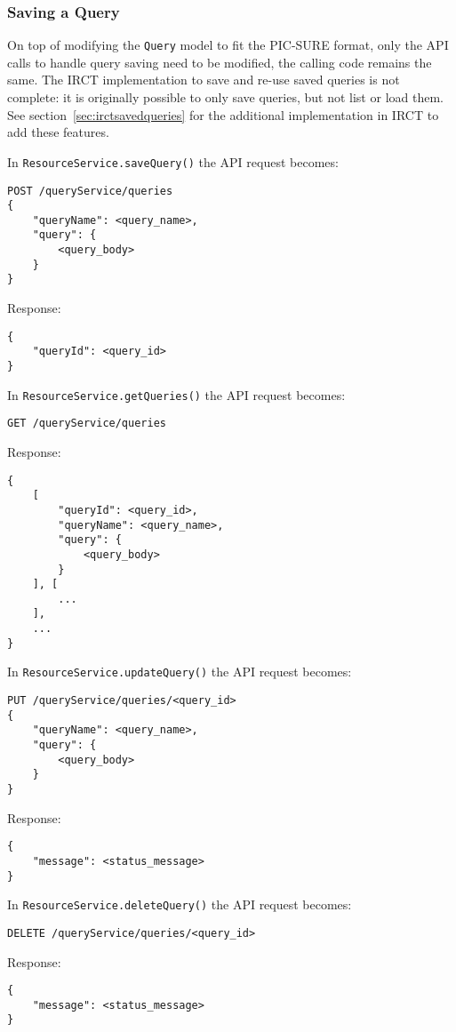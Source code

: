 \subsubsection{Saving a Query}
On top of modifying the \verb|Query| model to fit the PIC-SURE format, only the API calls to handle query saving need to be modified, the calling code remains the same.
The IRCT implementation to save and re-use saved queries is not complete: it is originally possible to only save queries, but not list or load them. 
See section~\ref{sec:irctsavedqueries} for the additional implementation in IRCT to add these features.

In \verb|ResourceService.saveQuery()| the API request becomes:
\begin{verbatim}
POST /queryService/queries
{
    "queryName": <query_name>,
    "query": {
        <query_body>
    }
}    
\end{verbatim}

Response:
\begin{verbatim}
{
    "queryId": <query_id>
}    
\end{verbatim}

In  \verb|ResourceService.getQueries()| the API request becomes:
\begin{verbatim}
GET /queryService/queries
\end{verbatim}

Response:
\begin{verbatim}
{
    [
        "queryId": <query_id>,
        "queryName": <query_name>,
        "query": {
            <query_body>
        }
    ], [
        ...
    ],
    ...
}    
\end{verbatim}

In  \verb|ResourceService.updateQuery()| the API request becomes:
\begin{verbatim}
PUT /queryService/queries/<query_id>
{
    "queryName": <query_name>,
    "query": {
        <query_body>
    }
}
\end{verbatim}

Response:
\begin{verbatim}
{
    "message": <status_message>
} 
\end{verbatim}

In  \verb|ResourceService.deleteQuery()| the API request becomes:
\begin{verbatim}
DELETE /queryService/queries/<query_id>
\end{verbatim}

Response:
\begin{verbatim}
{
    "message": <status_message>
} 
\end{verbatim}

